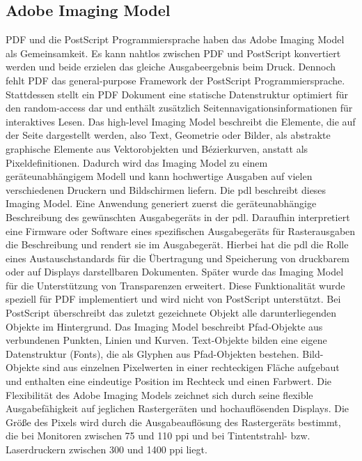 \subsection{Adobe Imaging Model}
PDF und die PostScript Programmiersprache haben das Adobe Imaging Model als Gemeinsamkeit. Es kann nahtlos zwischen PDF und PostScript konvertiert werden und beide erzielen das gleiche Ausgabeergebnis beim Druck. Dennoch fehlt PDF das general-purpose Framework der PostScript Programmiersprache. Stattdessen stellt ein PDF Dokument eine statische Datenstruktur optimiert für den random-access dar und enthält zusätzlich Seitennavigationsinformationen für interaktives Lesen. Das high-level Imaging Model beschreibt die Elemente, die auf der Seite dargestellt werden, also Text, Geometrie oder Bilder, als abstrakte graphische Elemente aus Vektorobjekten und Bézierkurven, anstatt als Pixeldefinitionen. Dadurch wird das Imaging Model zu einem geräteunabhängigem Modell und kann hochwertige Ausgaben auf vielen verschiedenen Druckern und Bildschirmen liefern. Die \gls{pdl} beschreibt dieses Imaging Model. Eine Anwendung generiert zuerst die geräteunabhängige Beschreibung des gewünschten Ausgabegeräts in der \gls{pdl}. Daraufhin interpretiert eine Firmware oder Software eines spezifischen Ausgabegeräts für Rasterausgaben die Beschreibung und rendert sie im Ausgabegerät. Hierbei hat die \gls{pdl} die Rolle eines Austauschstandards für die Übertragung und Speicherung von druckbarem oder auf Displays darstellbaren Dokumenten. \cite{adobe-postscript} Später wurde das Imaging Model für die Unterstützung von Transparenzen erweitert. Diese Funktionalität wurde speziell für PDF implementiert und wird nicht von PostScript unterstützt. Bei PostScript überschreibt das zuletzt gezeichnete Objekt alle darunterliegenden Objekte im Hintergrund. 
Das Imaging Model beschreibt Pfad-Objekte aus verbundenen Punkten, Linien und Kurven. Text-Objekte bilden eine eigene Datenstruktur (Fonts), die als Glyphen aus Pfad-Objekten bestehen. Bild-Objekte sind aus einzelnen Pixelwerten in einer rechteckigen Fläche aufgebaut und enthalten eine eindeutige Position im Rechteck und einen Farbwert. Die Flexibilität des Adobe Imaging Models zeichnet sich durch seine flexible Ausgabefähigkeit auf jeglichen Rastergeräten und hochauflösenden Displays. Die Größe des Pixels wird durch die Ausgabeauflösung des Rastergeräts bestimmt, die bei Monitoren zwischen 75 und 110 \gls{ppi} und bei Tintentstrahl- bzw. Laserdruckern zwischen 300 und 1400 \gls{ppi} liegt.
\cite{schneeberger}

